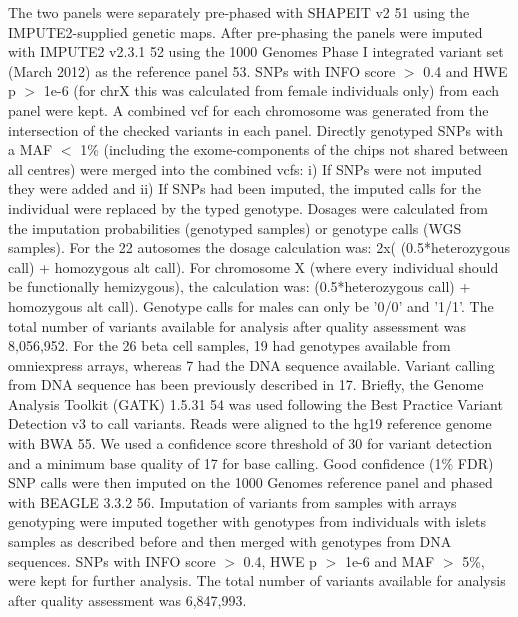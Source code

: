 The two panels were separately pre-phased with SHAPEIT v2 51 using the IMPUTE2-supplied genetic maps. After pre-phasing the panels were imputed with IMPUTE2 v2.3.1 52 using the 1000 Genomes Phase I integrated variant set (March 2012) as the reference panel 53. SNPs with INFO score $>$ 0.4 and HWE p $>$ 1e-6 (for chrX this was calculated from female individuals only) from each panel were kept. A combined vcf for each chromosome was generated from the intersection of the checked variants in each panel. Directly genotyped SNPs with a MAF $<$ 1\% (including the exome-components of the chips not shared between all centres) were merged into the combined vcfs: i) If SNPs were not imputed they were added and ii) If SNPs had been imputed, the imputed calls for the individual were replaced by the typed genotype. Dosages were calculated from the imputation probabilities (genotyped samples) or genotype calls (WGS samples). For the 22 autosomes the dosage calculation was: 2x( (0.5*heterozygous call) + homozygous alt call). For chromosome X (where every individual should be functionally hemizygous), the calculation was: (0.5*heterozygous call) + homozygous alt call). Genotype calls for males can only be '0/0' and '1/1'. The total number of variants available for analysis after quality assessment was 8,056,952.
For the 26 beta cell samples, 19 had genotypes available from omniexpress arrays, whereas 7 had the DNA sequence available. Variant calling from DNA sequence has been previously described in 17. Briefly, the Genome Analysis Toolkit (GATK) 1.5.31 54 was used following the Best Practice Variant Detection v3 to call variants. Reads were aligned to the hg19 reference genome with BWA 55. We used a confidence score threshold of 30 for variant detection and a minimum base quality of 17 for base calling. Good confidence (1\% FDR) SNP calls were then imputed on the 1000 Genomes reference panel and phased with BEAGLE 3.3.2 56. Imputation of variants from samples with arrays genotyping were imputed together with genotypes from individuals with islets samples as described before and then merged with genotypes from DNA sequences. SNPs with INFO score $>$ 0.4, HWE p $>$ 1e-6 and MAF $>$ 5\%, were kept for further analysis. The total number of variants available for analysis after quality assessment was 6,847,993.

